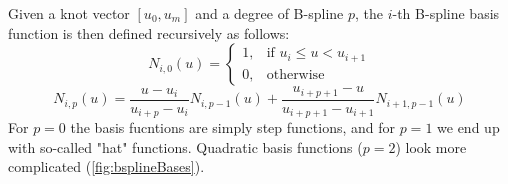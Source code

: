 Given a knot vector $[u_{0}, u_{m}]$ and a degree of B-spline $p$, the $i$-th B-spline basis function is then defined recursively as follows:
\begin{equation}
N_{i,0}(u) =  \begin{cases} 1, & \mbox{if } u_{i} \leq u < u_{i+1} \\ 0, & \mbox{otherwise } \end{cases}
\end{equation} 
\begin{equation}
N_{i,p}(u) = \frac{u - u_{i}}{u_{i+p} - u_{i}}N_{i, p-1}(u)  + \frac{u_{i+p+1}-u}{u_{i+p+1} - u_{i+1}}N_{i+1, p-1}(u)
\end{equation}
For $p=0$ the basis fucntions are simply step functions, and for $p=1$ we end up with so-called "hat" functions. Quadratic basis functions ($p=2$) look more complicated (\autoref{fig:bsplineBases}).
